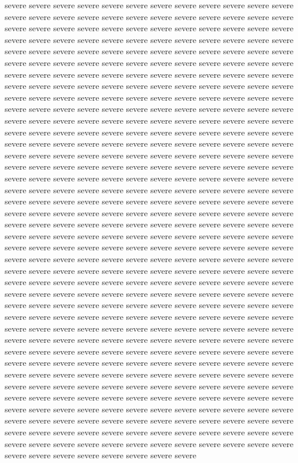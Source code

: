 \documentclass{article}
\begin{document}
severe severe severe severe severe severe severe severe severe severe severe severe severe severe severe severe severe severe severe severe severe severe severe severe severe severe severe severe severe severe severe severe severe severe severe severe severe severe severe severe severe severe severe severe severe severe severe severe severe severe severe severe severe severe severe severe severe severe severe severe severe severe severe severe severe severe severe severe severe severe severe severe severe severe severe severe severe severe severe severe severe severe severe severe severe severe severe severe severe severe severe severe severe severe severe severe severe severe severe severe severe severe severe severe severe severe severe severe severe severe severe severe severe severe severe severe severe severe severe severe severe severe severe severe severe severe severe severe severe severe severe severe severe severe severe severe severe severe severe severe severe severe severe severe severe severe severe severe severe severe severe severe severe severe severe severe severe severe severe severe severe severe severe severe severe severe severe severe severe severe severe severe severe severe severe severe severe severe severe severe severe severe severe severe severe severe severe severe severe severe severe severe severe severe severe severe severe severe severe severe severe severe severe severe severe severe severe severe severe severe severe severe severe severe severe severe severe severe severe severe severe severe severe severe severe severe severe severe severe severe severe severe severe severe severe severe severe severe severe severe severe severe severe severe severe severe severe severe severe severe severe severe severe severe severe severe severe severe severe severe severe severe severe severe severe severe severe severe severe severe severe severe severe severe severe severe severe severe severe severe severe severe severe severe severe severe severe severe severe severe severe severe severe severe severe severe severe severe severe severe severe severe severe severe severe severe severe severe severe severe severe severe severe severe severe severe severe severe severe severe severe severe severe severe severe severe severe severe severe severe severe severe severe severe severe severe severe severe severe severe severe severe severe severe severe severe severe severe severe severe severe severe severe severe severe severe severe severe severe severe severe severe severe severe severe severe severe severe severe severe severe severe severe severe severe severe severe severe severe severe severe severe severe severe severe severe severe severe severe severe severe severe severe severe severe severe severe severe severe severe severe severe severe severe severe severe severe severe severe severe severe severe severe severe severe severe severe severe severe severe severe severe severe severe severe severe severe severe severe severe severe severe severe severe severe severe severe severe severe severe severe severe severe severe severe severe severe severe severe severe severe severe severe severe severe severe severe severe severe severe severe severe severe severe severe severe severe severe severe severe severe severe severe severe severe severe 
\end{document}
